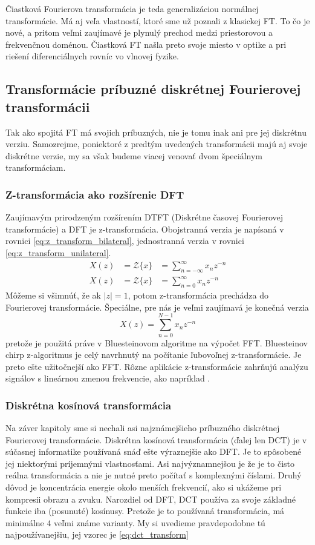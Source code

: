 Čiastková Fourierova transformácia je teda generalizáciou normálnej
transformácie. Má aj veľa vlastností, ktoré sme už poznali z klasickej
FT. To čo je nové, a pritom veľmi zaujímavé je plynulý prechod medzi
priestorovou a frekvenčnou doménou. Čiastková FT našla preto svoje
miesto v optike a pri riešení diferenciálnych
rovníc vo vlnovej fyzike.

\subsection{Transformácie príbuzné diskrétnej Fourierovej
transformácii}
Tak ako spojitá FT má svojich príbuzných, nie je tomu inak ani pre jej
diskrétnu verziu. Samozrejme, poniektoré z predtým uvedených
transformácii majú aj svoje diskrétne verzie, my sa však budeme viacej
venovať dvom špeciálnym transformáciam.

\subsubsection{Z-transformácia ako rozšírenie DFT}
Zaujímavým prirodzeným rozšírením DTFT (Diskrétne časovej Fourierovej
transformácie) a DFT je z-transformácia. Obojstranná verzia je
napísaná v rovnici \ref{eq:z_transform_bilateral}, jednostranná verzia
v rovnici \ref{eq:z_transform_unilateral}.
\begin{eqnarray}
    \label{eq:z_transform_bilateral}
    X(z) &= \mathcal{Z}\{x\} &= \sum_{n=-\infty}^{\infty} x_n z^{-n} \\
    \label{eq:z_transform_unilateral}
    X(z) &= \mathcal{Z}\{x\} &= \sum_{n=0}^{\infty} x_n z^{-n}
\end{eqnarray}
Môžeme si všimnúť, že ak $|z|=1$, potom z-transformácia prechádza do
Fourierovej transformácie.
Špeciálne, pre nás je veľmi zaujímavá je konečná verzia
\begin{equation}
 X(z) = \sum_{n=0}^{N-1} x_n z^{-n}
\end{equation}
pretože je použitá práve v Bluesteinovom algoritme na výpočet FFT.
Bluesteinov chirp z-algoritmus je celý navrhnutý na počítanie
ľubovoľnej z-transformácie. Je preto ešte užitočnejší ako FFT. Rôzne
aplikácie z-transformácie zahrňujú analýzu signálov s lineárnou zmenou
frekvencie, ako napríklad .

\subsubsection{Diskrétna kosínová transformácia}
Na záver kapitoly sme si nechali asi najznámejšieho príbuzného
diskrétnej Fourierovej transformácie. Diskrétna kosínová transformácia
(ďalej len DCT) je v súčasnej informatike používaná snáď ešte
výraznejšie ako DFT. Je to spôsobené jej niektorými príjemnými
vlastnosťami. Asi najvýznamnejšou je že je to čisto reálna
transformácia a nie je nutné preto počítať s komplexnými číslami.
Druhý dôvod je koncentrácia energie okolo menších frekvencií, ako si
ukážeme pri kompresii obrazu a zvuku.
Narozdiel od DFT, DCT používa za svoje základné funkcie iba (posunuté) kosínusy.
Pretože je to používaná transformácia, má minimálne 4 veľmi známe
varianty. My si uvedieme pravdepodobne tú najpoužívanejšiu, jej vzorec
je \ref{eq:dct_transform}

